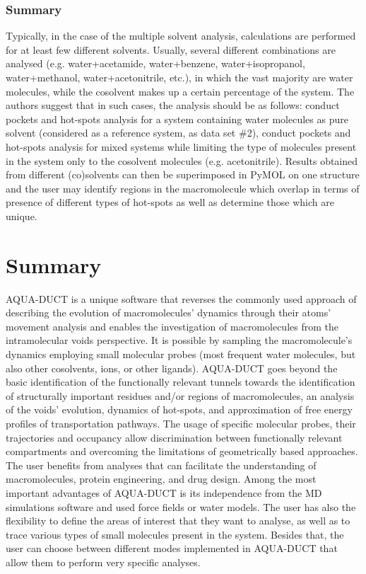 \documentclass[9pt,tutorial, pubversion]{livecoms}
\begin{document}
\subsubsection{Summary}
Typically, in the case of the multiple solvent analysis, calculations are performed for at least few different solvents. Usually, several different combinations are analysed (e.g. water+acetamide, water+benzene, water+isopropanol, water+methanol, water+acetonitrile, etc.), in which the vast majority are water molecules, while the cosolvent makes up a certain percentage of the system. The authors suggest that in such cases, the analysis should be as follows: conduct pockets and hot-spots analysis for a system containing water molecules as pure solvent (considered as a reference system, as data set \#2), conduct pockets and hot-spots analysis for mixed systems while limiting the type of molecules present in the system only to the cosolvent molecules (e.g. acetonitrile). Results obtained from different (co)solvents can then be superimposed in PyMOL on one structure and the user may identify regions in the macromolecule which overlap in terms of presence of different types of hot-spots as well as determine those which are unique.     

\section{Summary}
AQUA-DUCT is a unique software that reverses the commonly used approach of describing the evolution of macromolecules’ dynamics through their atoms’ movement analysis and enables the investigation of macromolecules from the intramolecular voids perspective. It is possible by sampling the macromolecule's dynamics employing small molecular probes (most frequent water molecules, but also other cosolvents, ions, or other ligands). AQUA-DUCT goes beyond the basic identification of the functionally relevant tunnels towards the identification of structurally important residues and/or regions of macromolecules, an analysis of the voids’ evolution, dynamics of hot-spots, and approximation of free energy profiles of transportation pathways. The usage of specific molecular probes, their trajectories and occupancy allow discrimination between functionally relevant compartments and overcoming the limitations of geometrically based approaches. The user benefits from analyses that can facilitate the understanding of macromolecules, protein engineering, and drug design. Among the most important advantages of AQUA-DUCT is its independence from the MD simulations software and used force fields or water models. The user has also the flexibility to define the areas of interest that they want to analyse, as well as to trace various types of small molecules present in the system. Besides that, the user can choose between different modes implemented in AQUA-DUCT that allow them to perform very specific analyses. 
\end{document}
